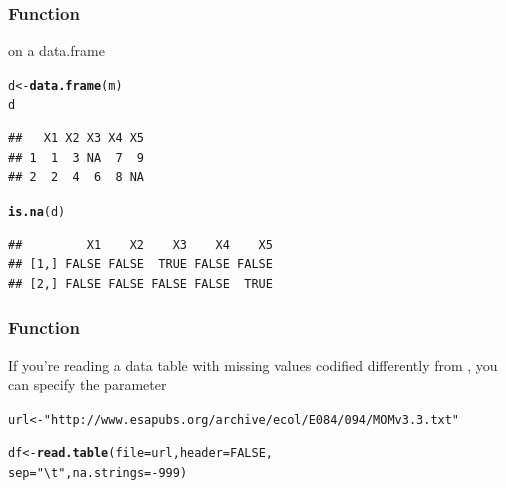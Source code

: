 \documentclass[12pt]{beamer}\usepackage[]{graphicx}\usepackage[]{color}
\makeatletter
\newcommand{\hlnum}[1]{\textcolor[rgb]{0.686,0.059,0.569}{#1}}%
\newcommand{\hlstr}[1]{\textcolor[rgb]{0.192,0.494,0.8}{#1}}%
\newcommand{\hlopt}[1]{\textcolor[rgb]{0,0,0}{#1}}%
\newcommand{\hlstd}[1]{\textcolor[rgb]{0.345,0.345,0.345}{#1}}%
\newcommand{\hlkwb}[1]{\textcolor[rgb]{0.69,0.353,0.396}{#1}}%
\newcommand{\hlkwc}[1]{\textcolor[rgb]{0.333,0.667,0.333}{#1}}%
\newcommand{\hlkwd}[1]{\textcolor[rgb]{0.737,0.353,0.396}{\textbf{#1}}}%
\newenvironment{kframe}{%
 \def\at@end@of@kframe{}%
 \ifinner\ifhmode%
  \def\at@end@of@kframe{\end{minipage}}%
  \begin{minipage}{\columnwidth}%
 \fi\fi%
 \def\FrameCommand##1{\hskip\@totalleftmargin \hskip-\fboxsep
 \colorbox{shadecolor}{##1}\hskip-\fboxsep
     \hskip-\linewidth \hskip-\@totalleftmargin \hskip\columnwidth}%
 \MakeFramed {\advance\hsize-\width
   \@totalleftmargin\z@ \linewidth\hsize
   \@setminipage}}%
 {\par\unskip\endMakeFramed%
 \at@end@of@kframe}
\newenvironment{knitrout}{}{} %
\makeatother
\begin{document}

\begin{frame}[fragile]
\frametitle{Function }

 on a data.frame
\begin{knitrout}\footnotesize
{}\color{fgcolor}\begin{kframe}
\begin{alltt}
\hlstd{d} \hlkwb{<-} \hlkwd{data.frame}\hlstd{(m)}
\hlstd{d}
\end{alltt}
\begin{verbatim}
##   X1 X2 X3 X4 X5
## 1  1  3 NA  7  9
## 2  2  4  6  8 NA
\end{verbatim}
\begin{alltt}
\hlkwd{is.na}\hlstd{(d)}
\end{alltt}
\begin{verbatim}
##         X1    X2    X3    X4    X5
## [1,] FALSE FALSE  TRUE FALSE FALSE
## [2,] FALSE FALSE FALSE FALSE  TRUE
\end{verbatim}
\end{kframe}
\end{knitrout}

\end{frame}


\begin{frame}[fragile]
\frametitle{Function }

If you're reading a data table with missing values codified differently from , you can specify the parameter {\hilit {}}

\begin{knitrout}\scriptsize
{}\color{fgcolor}\begin{kframe}
\begin{alltt}
\hlstd{url} \hlkwb{<-} \hlstr{"http://www.esapubs.org/archive/ecol/E084/094/MOMv3.3.txt"}

\hlstd{df} \hlkwb{<-} \hlkwd{read.table}\hlstd{(}\hlkwc{file} \hlstd{= url,} \hlkwc{header} \hlstd{=} \hlnum{FALSE}\hlstd{,}
                 \hlkwc{sep} \hlstd{=} \hlstr{"\textbackslash{}t"}\hlstd{,} \hlkwc{na.strings} \hlstd{=} \hlopt{-}\hlnum{999}\hlstd{)}
\end{alltt}
\end{kframe}
\end{knitrout}

\end{frame}
\end{document}
